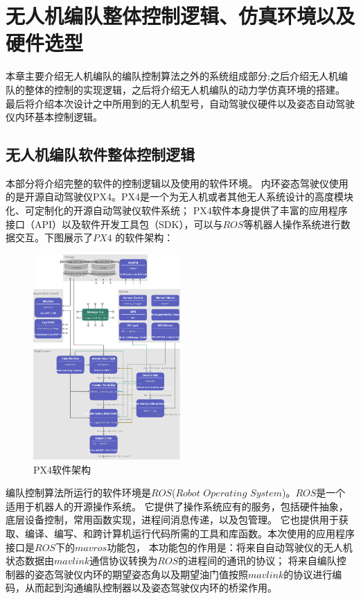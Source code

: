 \chapter{无人机编队整体控制逻辑、仿真环境以及硬件选型}
\label{chap:hardware}
本章主要介绍无人机编队的编队控制算法之外的系统组成部分;之后介绍无人机编队的整体的控制的实现逻辑，之后将介绍无人机编队的动力学仿真环境的搭建。
最后将介绍本次设计之中所用到的无人机型号，自动驾驶仪硬件以及姿态自动驾驶仪内环基本控制逻辑。
\section{无人机编队软件整体控制逻辑}
本部分将介绍完整的软件的控制逻辑以及使用的软件环境。
内环姿态驾驶仪使用的是开源自动驾驶仪PX4。PX4是一个为无人机或者其他无人系统设计的高度模块化、可定制化的开源自动驾驶仪软件系统；
PX4软件本身提供了丰富的应用程序接口（API）以及软件开发工具包（SDK），可以与$ROS$等机器人操作系统进行数据交互。下图展示了$PX4$
的软件架构：
\begin{figure}[H]
    \centering
    \includegraphics[width=0.5\textwidth]{figures/c4/PX4_archticher.png}
    \caption{PX4软件架构}\label{fig:PX4_archticher.png}
\end{figure}

编队控制算法所运行的软件环境是$ROS$($Robot$ $Operating$ $System$)。$ROS$是一个适用于机器人的开源操作系统。
它提供了操作系统应有的服务，包括硬件抽象，底层设备控制，常用函数实现，进程间消息传递，以及包管理。
它也提供用于获取、编译、编写、和跨计算机运行代码所需的工具和库函数。本次使用的应用程序接口是$ROS$下的$mavros$功能包，
本功能包的作用是：将来自自动驾驶仪的无人机状态数据由$mavlink$通信协议转换为$ROS$的进程间的通讯的协议；
将来自编队控制器的姿态驾驶仪内环的期望姿态角以及期望油门值按照$mavlink$的协议进行编码，从而起到沟通编队控制器以及姿态驾驶仪内环的桥梁作用。
